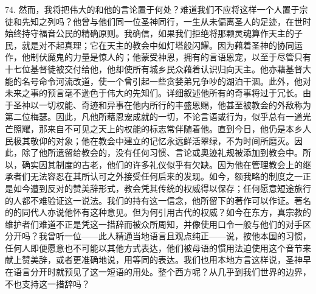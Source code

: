 74. 然而，我将把伟大的和他的言论置于何处？难道我们不应将这样一个人置于宗徒和先知之列吗？他曾与他们同一位圣神同行，一生从未偏离圣人的足迹，在世时始终持守福音公民的精确原则。我确信，如果我们拒绝将那颗灵魂算作天主的子民，就是对不起真理；它在天主的教会中如灯塔般闪耀。因为藉着圣神的协同运作，他制伏魔鬼的力量是惊人的；他蒙受神恩，拥有的言语恩宠，以至于尽管只有十七位基督徒被交付给他，他却使所有城乡民众藉着认识归向天主。他亦藉基督大能的名号命令河流改道，使一个曾引起一些贪婪弟兄争吵的湖泊干涸。此外，他对未来之事的预言毫不逊色于伟大的先知们。详细叙述他所有的奇事将过于冗长。由于圣神以一切权能、奇迹和异事在他内所行的丰盛恩赐，他甚至被教会的外敌称为第二位梅瑟。因此，凡他所藉恩宠成就的一切，不论言语或行为，似乎总有一道光芒照耀，那来自不可见之天上的权能的标志常伴随着他。直到今日，他仍是本乡人民极其敬仰的对象；他在教会中建立的记忆永远鲜活翠绿，不为时间所磨灭。因此，除了他所遗留给教会的，没有任何习惯、言论或奥迹礼规被添加到教会中。所以，确实因其制度的古老，他们的许多礼仪似乎有欠缺。因为他在管理教会上的继承者们无法容忍在其所认可之外接受任何后来的发现。如今，额我略的制度之一正是如今遭到反对的赞美辞形式，教会凭其传统的权威得以保存；任何愿意短途旅行的人都不难验证这一说法。我们的持有这一信念，他所留下的著作可以作证。著名的的同代人亦说他怀有这种意见。但为何引用古代的权威？如今在东方，真宗教的维护者们难道不正是凭这一措辞而被众所周知，并像使用口令一般与他们的对手区分开吗？我曾听一位——此人精通当地语言且观点纯正——说，按他本国的习惯，任何人即便愿意也不可能以其他方式表达，他们被母语的惯用法迫使用这个音节来献上赞美辞，或者更准确地说，用等同的表达。我们也用本地方言这样说，圣神早在语言分开时就预见了这一短语的用处。整个西方呢？从几乎到我们世界的边界，不也支持这一措辞吗？\par

